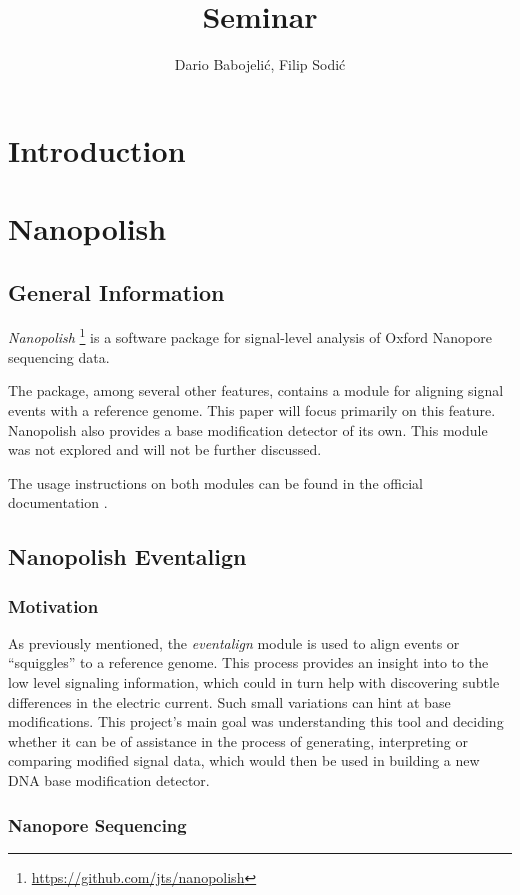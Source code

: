 \documentclass[times, utf, seminar]{fer}
\title{Seminar}
\author{Dario Babojelić, Filip Sodić}
\begin{document}
\maketitle
\tableofcontents
\newpage
\chapter{Introduction}


\chapter{Nanopolish}

\section{General Information}
\emph{Nanopolish}
\footnote{\url{https://github.com/jts/nanopolish}}
is a software package for signal-level analysis of Oxford Nanopore sequencing data.


The package, among several other features, contains a module for aligning signal events with a reference genome. This paper will focus primarily on this feature. Nanopolish also provides a base modification detector of its own. This module was not explored and will not be further discussed.

The usage instructions on both modules can be found in the official documentation \citep{nanopolish}.

\section{Nanopolish Eventalign}

\subsection{Motivation}
As previously mentioned, the \emph{eventalign} module is used to align events or “squiggles” to a reference genome. This process provides an insight into to the low
level signaling information, which could in turn help with discovering subtle differences in
the electric current. Such small variations can hint at base modifications. This project's main goal was understanding this tool and deciding whether it can be of assistance in the process of generating, interpreting or comparing modified signal data, which would then be used in building a new DNA base modification detector.

\subsection{Nanopore Sequencing}\label{sequencing}
\end{document}
